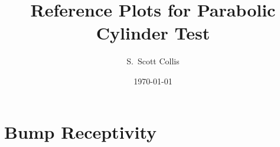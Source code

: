 \documentclass[12pt, oneside]{amsart}
\title{Reference Plots for Parabolic Cylinder Test}
\author{S.\ Scott Collis}
\date{\today}
\begin{document}
\maketitle


\section{Bump Receptivity}

\begin{figure}[!hbt]
\centering

\end{figure}
\end{document}
